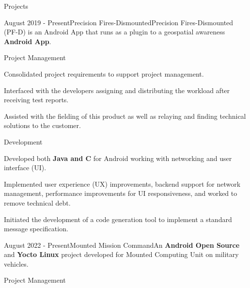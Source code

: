 \documentclass{article}
\newlength{\tabin}
\newlength{\secsep}
\newcommand{\lineunder}{\vspace*{-8pt} \\ \hspace*{-6pt} \hrulefill \\ \vspace*{-15pt}}
\newenvironment{tabbedsection}[1]{
	\begin{list}{}{
			\setlength{\itemsep}{0pt}
			\setlength{\labelsep}{0pt}
			\setlength{\labelwidth}{0pt}
			\setlength{\leftmargin}{0pt}
			\setlength{\rightmargin}{\tabin}
			\setlength{\listparindent}{0pt}
			\setlength{\parsep}{0pt}
			\setlength{\parskip}{0pt}
			\setlength{\partopsep}{0pt}
			\setlength{\topsep}{#1}
		}
		\item[]
	}{\end{list}}
\newenvironment{resume_section}[1]{
	\filbreak
	\vspace{2\secsep}
	\textsc{\color{blue}\large#1}
	\lineunder
	\begin{tabbedsection}{\secsep}
	}{\end{tabbedsection}}
\newenvironment{resume_project_subsection}[3]{
	\textbf{\color{BlueViolet}#2} \hfill \hspace{-5em} {\normalsize (#1)}
	\\ {\small \textit{ #3}}
	\begin{tabbedsection}{0.5\secsep}
		\begin{subitems}
		}{\end{subitems}\end{tabbedsection}}
\newenvironment{subitems}{
	\renewcommand{\labelitemi}{-}
	\begin{itemize}
		\setlength{\labelsep}{1em}
	}{\end{itemize}}
\newenvironment{resume_skill_group}[1]{
	\hspace{-18pt}\textbf{#1}
	\begin{itemize}
	}{\end{itemize}}
\begin{document}
	\vspace{-3\secsep}
	
	\begin{resume_section}{Projects}
		\begin{resume_project_subsection}{August 2019 - Present}{Precision Fires-Dismounted}{Precision Fires-Dismounted (PF-D) is an Android App that runs as a plugin to a geospatial awareness \textbf{Android App}.}			
			\begin{resume_skill_group}{Project Management}
				\item 
				\item 
					Consolidated project requirements to support project management. 
				\item 
					Interfaced with the developers assigning and distributing the workload after receiving test reports.
				\item 
					Assisted with the fielding of this product as well as relaying and finding technical solutions to the customer. 
				\end{resume_skill_group}
				
				\begin{resume_skill_group}{Development}
						\item 
				
					\item
					Developed both \textbf{Java and C} for Android working with networking and user interface (UI).
					\item
					Implemented user experience (UX) improvements, backend support for network
					management, performance improvements for UI responsiveness, and worked to remove technical debt. 
					\iffalse
					\item 
					Implemented basic geographical calculations. 
					\fi
					\item 
					Initiated the development of a code generation tool to implement a standard message specification. 
				\end{resume_skill_group}
		\end{resume_project_subsection}
		\vspace{2\secsep}
		\begin{resume_project_subsection}{August 2022 - Present}{Mounted Mission Command}{An \textbf{Android Open Source} and \textbf{Yocto Linux} project developed for Mounted Computing Unit on military vehicles.}
			\begin{resume_skill_group}{Project Management}
					\item 
				

\end{resume_skill_group}
\end{resume_project_subsection}
\end{resume_section}
\end{document}
